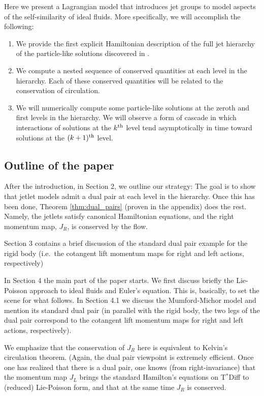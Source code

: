 \documentclass[12pt]{amsart}
\begin{document}
  Here we present a Lagrangian model that introduces jet groups to model aspects
  of the self-similarity of ideal fluids.
More specifically, we will accomplish the following:
\begin{enumerate}
  \item We provide the first explicit Hamiltonian description of the full jet hierarchy of the particle-like solutions discovered in 
  	\cite{JacobsRatiuDesbrun2013,CotterHolmJacobsMeier2014}.
  \item We compute a nested sequence of conserved quantities at 
    each level in the hierarchy.
    Each of these conserved quantities will be related to the conservation
    of circulation.
  \item We will numerically compute some particle-like solutions at the zeroth and first levels in the hierarchy.  We will observe a form of cascade in which interactions of solutions at the $k^{\rm th}$ level tend asymptotically in time toward solutions at the $(k+1)^{\rm th}$ level.
\end{enumerate}

\subsection{Outline of the paper}
After the introduction, in Section 2, we outline our strategy: The goal is to show that jetlet models admit a dual pair at each level in the hierarchy. Once this has been done, Theorem \ref{thm:dual_pairs} (proven in the appendix) does the rest. Namely, the jetlets satisfy canonical Hamiltonian equations, and the right momentum map, $J_R$, is conserved by the flow.

Section 3 contains a brief discussion of the standard dual pair example for the rigid body (i.e.\ the cotangent lift momentum maps for right and left actions, respectively)

In Section 4 the main part of the paper starts. We first discuss briefly the Lie-Poisson approach to ideal fluids and Euler's equation. This is, basically, to set the scene for what follows. In Section 4.1 we discuss the Mumford-Michor model and mention its standard dual pair (in parallel with the rigid body, the two legs of the dual pair correspond to the cotangent lift momentum maps for right and left actions, respectively). 

We emphasize that the conservation of $J_R$ here is equivalent to Kelvin's circulation theorem. (Again, the dual pair viewpoint is extremely efficient. Once one has realized that there is a dual pair, one knows (from right-invariance) that the momentum map $J_L$ brings the standard Hamilton's equations on T$^*$Diff to (reduced) Lie-Poisson form, and that at the same time $J_R$  is conserved.
\end{document}
